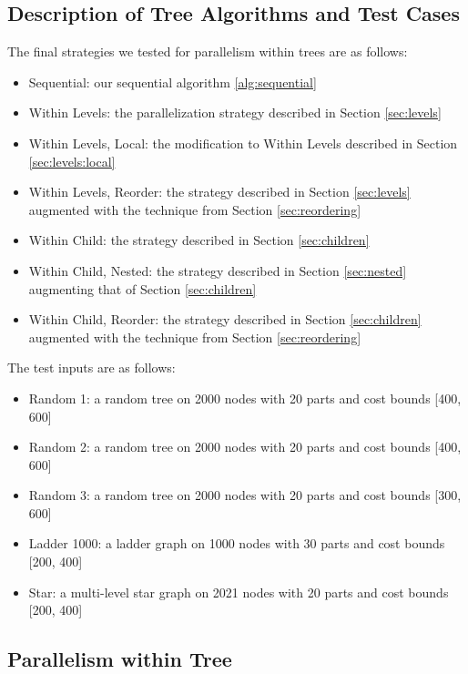 \documentclass[11pt]{article}
\begin{document}
\subsection{Description of Tree Algorithms and Test Cases}

The final strategies we tested for parallelism within trees are as follows:
\begin{itemize}
    \item Sequential: our sequential algorithm \ref{alg:sequential}
    \item Within Levels: the parallelization strategy described in Section \ref{sec:levels}
    \item Within Levels, Local: the modification to Within Levels described in Section \ref{sec:levels:local}
    \item Within Levels, Reorder: the strategy described in Section \ref{sec:levels} augmented with the technique from Section \ref{sec:reordering}
    \item Within Child: the strategy described in Section \ref{sec:children}
    \item Within Child, Nested: the strategy described in Section \ref{sec:nested} augmenting that of Section \ref{sec:children}
    \item Within Child, Reorder: the strategy described in Section \ref{sec:children} augmented with the technique from Section \ref{sec:reordering}
\end{itemize}

The test inputs are as follows:
\begin{itemize}
    \item Random 1: a random tree on 2000 nodes with 20 parts and cost bounds [400, 600]
    \item Random 2: a random tree on 2000 nodes with 20 parts and cost bounds [400, 600]
    \item Random 3: a random tree on 2000 nodes with 20 parts and cost bounds [300, 600]
    \item Ladder 1000: a ladder graph on 1000 nodes with 30 parts and cost bounds [200, 400]
    \item Star: a multi-level star graph on 2021 nodes with 20 parts and cost bounds [200, 400]
\end{itemize}

\subsection{Parallelism within Tree}
\end{document}

